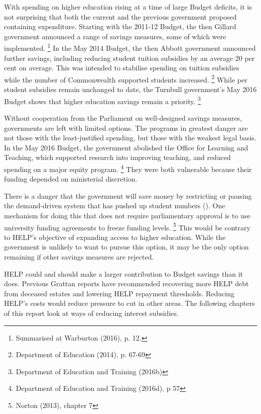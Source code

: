 \documentclass[embargoed]{grattan}
\begin{document}
With spending on higher education rising at a time of large Budget deficits, it is not surprising that both the current and the previous government proposed containing expenditure.
Starting with the 2011-12 Budget, the then Gillard government announced a range of savings measures, some of which were implemented.%
\footnote{Summarised at Warburton (2016), p. 12.} In the May 2014 Budget, the then Abbott government announced further savings, including reducing student tuition subsidies by an average 20 per cent on average.
This was intended to stabilise spending on tuition subsidies while the number of Commonwealth supported students increased.%
\footnote{Department of Education (2014), p. 67-69} While per student subsidies remain unchanged to date, the Turnbull government's May 2016 Budget shows that higher education savings remain a priority.%
\footnote{Department of Education and Training (2016b)}

Without cooperation from the Parliament on well-designed savings measures, governments are left with limited options.
The programs in greatest danger are not those with the least-justified spending, but those with the weakest legal basis.
In the May 2016 Budget, the government abolished the Office for Learning and Teaching, which supported research into improving teaching, and reduced spending on a major equity program.%
\footnote{Department of Education and Training (2016d), p 57} They were both vulnerable because their funding depended on ministerial discretion.

There is a danger that the government will save money by restricting or pausing the demand-driven system that has pushed up student numbers ().
One mechanism for doing this that does not require parliamentary approval is to use university funding agreements to freeze funding levels.%
\footnote{Norton (2013), chapter 7} This would be contrary to \gls{HELP}'s objective of expanding access to higher education.
While the government is unlikely to want to pursue this option, it may be the only option remaining if other savings measures are rejected.

\gls{HELP} could and should make a larger contribution to Budget savings than it does.
Previous Grattan reports have recommended recovering more \gls{HELP} debt from deceased estates and lowering \gls{HELP} repayment thresholds.
Reducing \gls{HELP}'s costs would reduce pressure to cut in other areas.
The following chapters of this report look at ways of reducing interest subsidies.
\end{document}
